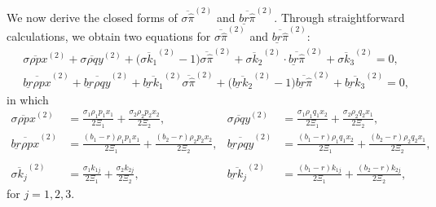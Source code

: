 \documentclass[11pt]{article}
\numberwithin{equation}{section}
\begin{document}
	We now derive the closed forms of \(\overline{\sigma\widehat{\pi}}^{(2)}\) and \(\overline{\underline{br}\widehat{\pi}}^{(2)}\).  Through straightforward calculations, we obtain two equations for \(\overline{\sigma\widehat{\pi}}^{(2)}\) and \(\overline{\underline{br}\widehat{\pi}}^{(2)}\):
	\begin{align}
		&\overline{\sigma\rho px}^{(2)}+\overline{\sigma\rho qy}^{(2)}+\big(\overline{\sigma k_1}^{(2)}-1\big)\overline{\sigma\widehat{\pi}}^{(2)}+\overline{\sigma k_2}^{(2)}\cdot\overline{\underline{br}\widehat{\pi}}^{(2)}+\overline{\sigma k_3}^{(2)}=0,\label{eq:system1}\\
		& \overline{\underline{br}\rho px}^{(2)}+\overline{\underline{br}\rho qy}^{(2)}+\overline{\underline{br}k_1}^{(2)}\overline{\sigma\widehat{\pi}}^{(2)}+\big(\overline{\underline{br}k_2}^{(2)}-1\big)\overline{\underline{br}\widehat{\pi}}^{(2)}+\overline{\underline{br}k_3}^{(2)}=0,\label{eq:system2}
	\end{align}
in which
\begin{align}
\overline{\sigma\rho px}^{(2)}&=\frac{\sigma_1\rho_1 p_1x_1}{2\Xi_1} + \frac{\sigma_2\rho_2 p_2x_2}{2\Xi_2},& \overline{\sigma\rho qy}^{(2)}&=\frac{\sigma_1\rho_1 q_1x_2}{2\Xi_1} + \frac{\sigma_2\rho_2 q_2x_1}{2\Xi_2},\label{eq:coeff1}\\
\overline{\underline{br}\rho px}^{(2)}&=\frac{(b_1-r)\rho_1 p_1x_1}{2\Xi_1}+\frac{(b_2-r)\rho_2 p_2x_2}{2\Xi_2},& \overline{\underline{br}\rho qy}^{(2)}&=\frac{(b_1-r)\rho_1 q_1x_2}{2\Xi_1} + \frac{(b_2-r)\rho_2 q_2x_1}{2\Xi_2},\\ \label{eq:coeff2} \\
\overline{\sigma k_j}^{(2)}&= \frac{\sigma_1k_{1j}}{2\Xi_1}+\frac{\sigma_2k_{2j}}{2\Xi_2},
&\overline{\underline{br}k_j}^{(2)}&= \frac{(b_1-r)k_{1j}}{2\Xi_1}+\frac{(b_2-r)k_{2j}}{2\Xi_2},\label{eq:coeff3}
	\end{align}
	for \(j=1,2,3\).
	
\end{document}
